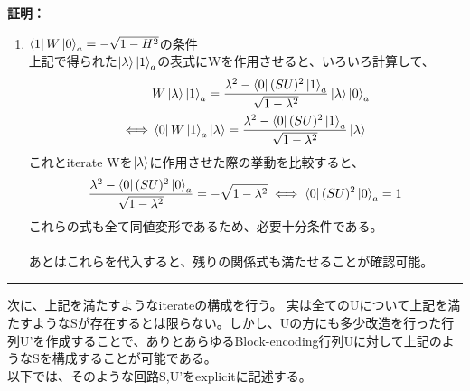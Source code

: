 \documentclass[a4paper,10.5pt]{article}
\numberwithin{equation}{section}
\newenvironment{proofbox}
{\begin{prooflabel}\textbf{証明：}\end{prooflabel}\vspace{0.8em}}
{\par\vspace{1em}\hrule\vspace{1em}}
\begin{document}
\begin{proofbox}
\begin{enumerate}
\begin{align*}
        \ket{\lambda}\ket{1}_{a}=\frac{1}{\sqrt{1-\lambda^{2}}}\big(\lambda\ket{\lambda}\ket{0}_{a}-SU\ket{\lambda}\ket{0}_{a}\big)
    \end{align*}
        \item $\bra{1}W\ket{0}_{a}=-\sqrt{1-H^{2}}$の条件\\
        上記で得られた$\ket{\lambda}\ket{1}_{a}$の表式にWを作用させると、いろいろ計算して、
        \begin{align*}
            &W\ket{\lambda}\ket{1}_{a}=\frac{\lambda^{2}-\bra{0}(SU)^{2}\ket{1}_{a}}{\sqrt{1-\lambda^{2}}}\ket{\lambda}\ket{0}_{a}\\
            \iff &\bra{0}W\ket{1}_{a}\ket{\lambda}=\frac{\lambda^{2}-\bra{0}(SU)^{2}\ket{1}_{a}}{\sqrt{1-\lambda^{2}}}\ket{\lambda}
        \end{align*}
        これとiterate Wを$\ket{\lambda}$に作用させた際の挙動を比較すると、
        \begin{align*}
            \frac{\lambda^{2}-\bra{0}(SU)^{2}\ket{0}_{a}}{\sqrt{1-\lambda^{2}}}=-\sqrt{1-\lambda^{2}}\iff \bra{0}(SU)^{2}\ket{0}_{a}=1
        \end{align*}
        これらの式も全て同値変形であるため、必要十分条件である。\\
        \\
        あとはこれらを代入すると、残りの関係式も満たせることが確認可能。
        \end{enumerate}
\end{proofbox}
次に、上記を満たすようなiterateの構成を行う。 実は全てのUについて上記を満たすようなSが存在するとは限らない。しかし、Uの方にも多少改造を行った行列U'を作成することで、ありとあらゆるBlock-encoding行列Uに対して上記のようなSを構成することが可能である。\\
以下では、そのような回路S,U'をexplicitに記述する。
\end{document}
